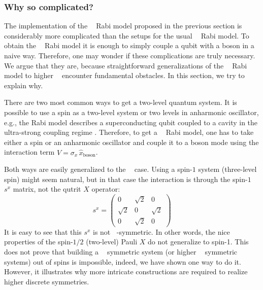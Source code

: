 \documentclass[reprint, aps, prx, amsmath, amssymb, longbibliography, superscriptaddress]{revtex4-2}
\DeclareMathOperator{\Zn}{\mathbb{Z}_n}
\DeclareMathOperator{\Zthree}{\mathbb{Z}_3}
\DeclareMathOperator{\Ztwo}{\mathbb{Z}_2}
\begin{document}
\subsubsection{Why so complicated?}

The implementation of the $\Zthree$ Rabi model proposed in the previous section is considerably more complicated than the setups for the usual $\Ztwo$ Rabi model. To obtain the $\Ztwo$ Rabi model it is enough to simply couple a qubit with a boson in a naive way. Therefore, one may wonder if these complications are truly necessary. We argue that they are, because straightforward generalizations of the $\Ztwo$ Rabi model to higher $\Zn$ encounter fundamental obstacles. In this section, we try to explain why.

There are two most common ways to get a two-level quantum system. It is possible to use a spin as a two-level system  \cite{bosco_fully_2022,felicetti_quantum_2017,skogvoll_tunable_2021} or two levels in anharmonic oscillator, e.g., the Rabi model describes a superconducting qubit coupled to a cavity in the ultra-strong coupling regime \cite{niemczyk_circuit_2010,forn-diaz_ultrastrong_2017,yoshihara_superconducting_2017,vlasiuk_cavityinduced_2023, kozin_quantum_2024,chen_singlephotondriven_2017,ricco_reshaping_2022}. Therefore, to get a $\Ztwo$ Rabi model, one has to take either a spin or an anharmonic oscillator and couple it to a boson mode using the interaction term $\hat V = \sigma_x\, \hat x_{\text{boson}}$.

Both ways are easily generalized to the $\Zthree$ case. Using a spin-$1$ system (three-level spin) might seem natural, but in that case the interaction is through the spin-$1$ $s^x$ matrix, not the qutrit $X$ operator:
\begin{equation}
    s^x= \begin{pmatrix} 0 & \sqrt{2} & 0 \\ \sqrt{2} & 0 & \sqrt{2} \\ 0 & \sqrt{2} & 0 \end{pmatrix}
\end{equation}
It is easy to see that this $s^x$ is not $\Zthree$-symmetric. In other words, the nice properties of the spin-$1/2$ (two-level) Pauli $X$ do not generalize to spin-1. This does not prove that building a $\Zthree$ symmetric system (or higher $\Zn$ symmetric systems) out of spins is impossible, indeed, we have shown one way to do it. However, it illustrates why more intricate constructions are required to realize higher discrete symmetries.
\end{document}
